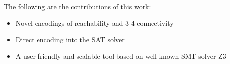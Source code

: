 

The following are the contributions of this work:
\begin{itemize}
\item Novel encodings of reachability and 3-4 connectivity
\item Direct encoding into the SAT solver
\item A user friendly and scalable tool based on well known SMT solver Z3
\end{itemize}


